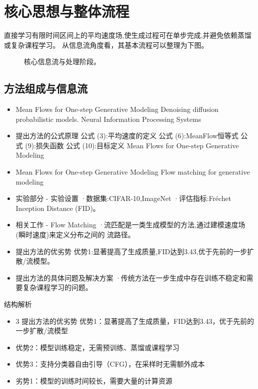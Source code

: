 \documentclass[UTF8,11pt,a4paper]{ctexart}
\begin{document}
\section{核心思想与整体流程}
直接学习有限时间区间上的平均速度场,使生成过程可在单步完成,并避免依赖蒸馏或复杂课程学习。 从信息流角度看，其基本流程可以整理为下图。

\begin{figure}[H]
\centering
{}
\caption{核心信息流与处理阶段。}
\end{figure}

\subsection{方法组成与信息流}
\begin{itemize}
\item Mean Flows for One-step Generative Modeling Denoising diffusion probabilistic models. Neural Information Processing Systems
\item 提出方法的公式原理 公式 (3):平均速度的定义 公式 (6):MeanFlow恒等式 公式 (9):损失函数 公式 (10):目标定义 Mean Flows for One-step Generative Modeling
\item Mean Flows for One-step Generative Modeling Flow matching for generative modeling
\item 实验部分 - 实验设置 ·数据集:CIFAR-10,ImageNet ·评估指标:Fréchet Inception Distance (FID)。
\item 相关工作 - Flow Matching ·流匹配是一类生成模型的方法,通过建模速度场(瞬时速度)来定义分布之间的 流路径。
\item 提出方法的优劣势 优势1:显著提高了生成质量,FID达到3.43,优于先前的一步扩散/流模型。
\item 提出方法的具体问题及解决方案 ·传统方法在一步生成中存在训练不稳定和需要复杂课程学习的问题。
\end{itemize}

\begin{keybox}{结构解析}
\begin{itemize}
\item 3 提出方法的优劣势 优势1：显著提高了生成质量，FID达到3.43，优于先前的一步扩散/流模型
\item 优势2：模型训练稳定，无需预训练、蒸馏或课程学习
\item 优势3：支持分类器自由引导（CFG），在采样时无需额外成本
\item 劣势1：模型的训练时间较长，需要大量的计算资源
\end{itemize}
\end{keybox}
\end{document}
